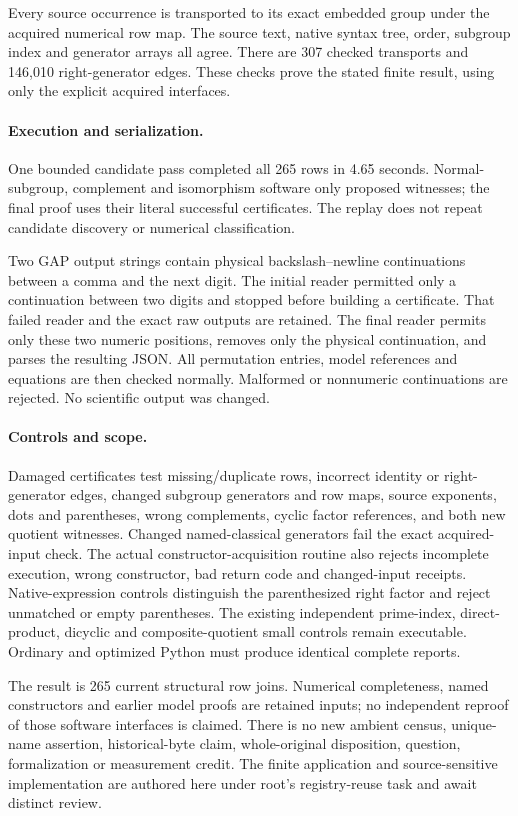 \documentclass[11pt]{article}
\begin{document}
Every source occurrence is transported to its exact embedded group
under the acquired numerical row map. The source text, native syntax tree,
order, subgroup index and generator arrays all agree. There are 307
checked transports and 146,010 right-generator edges. These checks prove
the stated finite result, using only the explicit acquired interfaces.

\paragraph{Execution and serialization.}
One bounded candidate pass completed all 265 rows in 4.65 seconds.
Normal-subgroup, complement and isomorphism software only proposed
witnesses; the final proof uses their literal successful certificates.
The replay does not repeat candidate discovery or numerical classification.

Two GAP output strings contain physical backslash--newline continuations
between a comma and the next digit. The initial reader permitted only a
continuation between two digits and stopped before building a certificate.
That failed reader and the exact raw outputs are retained. The final reader
permits only these two numeric positions, removes only the physical
continuation, and parses the resulting JSON. All permutation entries,
model references and equations are then checked normally. Malformed or
nonnumeric continuations are rejected. No scientific output was changed.

\paragraph{Controls and scope.}
Damaged certificates test missing/duplicate rows, incorrect identity or
right-generator edges, changed subgroup generators and row maps, source
exponents, dots and parentheses, wrong complements, cyclic factor references,
and both new quotient witnesses. Changed named-classical generators fail
the exact acquired-input check. The actual constructor-acquisition routine
also rejects incomplete execution, wrong constructor, bad return code and
changed-input receipts. Native-expression controls distinguish the
parenthesized right factor and reject unmatched or empty parentheses.
The existing independent prime-index, direct-product, dicyclic and
composite-quotient small controls remain executable. Ordinary and optimized
Python must produce identical complete reports.

The result is 265 current structural row joins. Numerical completeness,
named constructors and earlier model proofs are retained inputs; no
independent reproof of those software interfaces is claimed. There is no
new ambient census, unique-name assertion, historical-byte claim,
whole-original disposition, question, formalization or measurement credit.
The finite application and source-sensitive implementation are authored
here under root's registry-reuse task and await distinct review.
\end{document}
